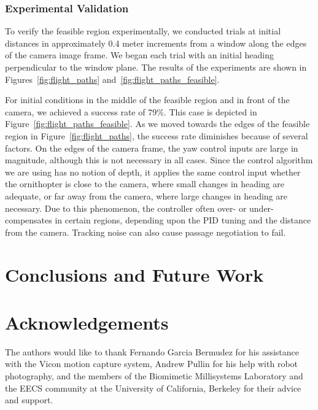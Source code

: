 \documentclass{aamas2013}
\begin{document}
\subsubsection{Experimental Validation}
To verify the feasible region experimentally, we conducted trials at initial
distances in approximately 0.4 meter increments from a window along the
edges of the camera image frame. We began each trial with an initial heading
perpendicular to the window plane. The results of the experiments are shown in
Figures~\ref{fig:flight_paths} and~\ref{fig:flight_paths_feasible}.

For initial conditions in the middle of the feasible region and in front of
the camera, we achieved a success rate of 79\%. This case is depicted in
Figure~\ref{fig:flight_paths_feasible}. As we moved towards the edges of the
feasible region in Figure~\ref{fig:flight_paths}, the success rate diminishes
because of several factors. On the edges of the camera frame, the yaw control
inputs are large in magnitude, although this is not necessary in all cases.
Since the control algorithm we are using has no notion of depth, it applies
the same control input whether the ornithopter is close to the camera, where
small changes in heading are adequate, or far away from the camera, where
large changes in heading are necessary. Due to this phenomenon, the controller
often over- or under-compensates in certain regions, depending upon the PID
tuning and the distance from the camera. Tracking noise can also cause passage
negotiation to fail.

\section{Conclusions and Future Work}

\section{Acknowledgements}
The authors would like to thank Fernando Garcia Bermudez for his 
assistance with the Vicon motion capture system, Andrew Pullin for his 
help with robot photography, and the members of the Biomimetic 
Millisystems Laboratory and the EECS community at the University of 
California, Berkeley for their advice and support.

\end{document}
